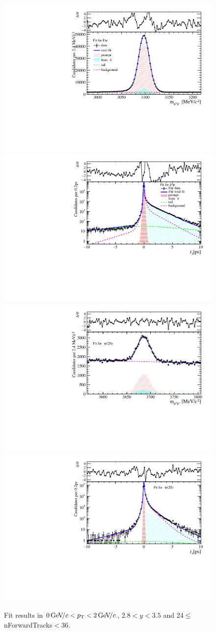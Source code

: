 \begin{figure}[H]
\begin{center}
\includegraphics[width=0.47\linewidth]{pdf/Jpsi/drawmassF/n3y2pt1.pdf}
\includegraphics[width=0.47\linewidth]{pdf/Jpsi/2DFitF/n3y2pt1.pdf}
\vspace*{-0.5cm}
\includegraphics[width=0.47\linewidth]{pdf/Psi2S/drawmassF/n3y2pt1.pdf}
\includegraphics[width=0.47\linewidth]{pdf/Psi2S/2DFitF/n3y2pt1.pdf}
\vspace*{-0.5cm}
\end{center}
\caption{Fit results in $0\text{\,Ge\kern -0.1em V\!/}c<p_{\mathrm{T}}<2\text{\,Ge\kern -0.1em V\!/}c$, $2.8<y<3.5$ and 24$\leq$nForwardTracks$<$36.}
\label{Fitn3y2pt1}
\end{figure}

